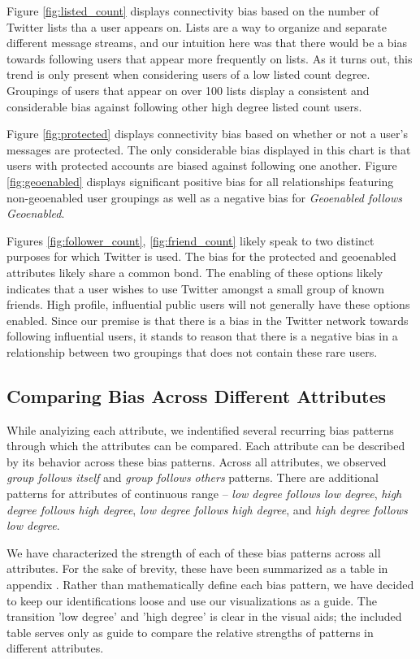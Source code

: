 Figure \ref{fig:listed_count} displays connectivity bias based on the number of Twitter lists tha a user appears on.  Lists are a way to organize and separate different message streams, and our intuition here was that there would be a bias towards following users that appear more frequently on lists.  As it turns out, this trend is only present when considering users of a low listed count degree.  Groupings of users that appear on over 100 lists display a consistent and considerable bias against following other high degree listed count users.

Figure \ref{fig:protected} displays connectivity bias based on whether or not a user's messages are protected.  The only considerable bias displayed in this chart is that users with protected accounts are biased against following one another.  Figure \ref{fig:geoenabled} displays significant positive bias for all relationships featuring non-geoenabled user groupings as well as a negative bias for \textit{Geoenabled follows Geoenabled}.

Figures \ref{fig:follower_count}, \ref{fig:friend_count} likely speak to two distinct purposes for which Twitter is used.  The bias for the protected and geoenabled attributes likely share a common bond.  The enabling of these options likely indicates that a user wishes to use Twitter amongst a small group of known friends.  High profile, influential public users will not generally have these options enabled.  Since our premise is that there is a bias in the Twitter network towards following influential users, it stands to reason that there is a negative bias in a relationship between two groupings that does not contain these rare users.

\subsection{Comparing Bias Across Different Attributes}
\label{sub:crossattribute}
While analyizing each attribute, we indentified several recurring bias patterns through which the attributes can be compared.  Each attribute can be described by its behavior across these bias patterns.  Across all attributes, we observed \textit{group follows itself} and \textit{group follows others} patterns.  There are additional patterns for attributes of continuous range -- \textit{low degree follows low degree}, \textit{high degree follows high degree}, \textit{low degree follows high degree}, and \textit{high degree follows low degree}.

We have characterized the strength of each of these bias patterns across all attributes.  For the sake of brevity, these have been summarized as a table in appendix \label{app:table_cross_attribute}.  Rather than mathematically define each bias pattern, we have decided to keep our identifications loose and use our visualizations as a guide.  The transition 'low degree' and 'high degree' is clear in the visual aids; the included table serves only as guide to compare the relative strengths of patterns in different attributes.
